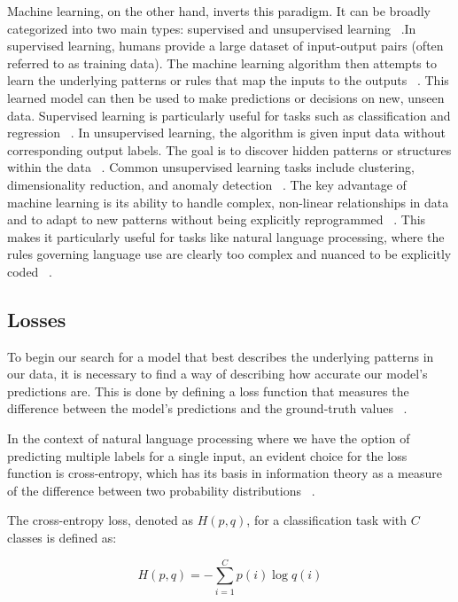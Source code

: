 \documentclass[a4paper, oneside]{discothesis}
\begin{document}
Machine learning, on the other hand, inverts this paradigm. It can be broadly categorized into two main types: supervised and unsupervised learning ~\cite{murphy2012machine}.In supervised learning, humans provide a large dataset of input-output pairs (often referred to as training data). 
The machine learning algorithm then attempts to learn the underlying patterns or rules that map the inputs to the outputs ~\cite{hastie2009elements}. 
This learned model can then be used to make predictions or decisions on new, unseen data.
Supervised learning is particularly useful for tasks such as classification and regression ~\cite{bishop2006pattern}.
In unsupervised learning, the algorithm is given input data without corresponding output labels. The goal is to discover hidden patterns or structures within the data ~\cite{ghahramani2004unsupervised}. Common unsupervised learning tasks include clustering, dimensionality reduction, and anomaly detection ~\cite{hinton2006reducing}.
The key advantage of machine learning is its ability to handle complex, non-linear relationships in data and to adapt to new patterns without being explicitly reprogrammed ~\cite{goodfellow2016deep}. 
This makes it particularly useful for tasks like natural language processing, where the rules governing language use are clearly too complex and nuanced to be explicitly coded ~\cite{jurafsky2009speech}.

\subsection{Losses}
To begin our search for a model that best describes the underlying patterns in our data, it is necessary to find a way of describing how accurate our model's predictions are.
This is done by defining a loss function that measures the difference between the model's predictions and the ground-truth values ~\cite{goodfellow2016deep}.

In the context of natural language processing where we have the option of predicting multiple labels for a single input, an evident choice for the loss function is cross-entropy, which 
has its basis in information theory as a measure of the difference between two probability distributions ~\cite{shannon1948mathematical}.

The cross-entropy loss, denoted as $H(p,q)$, for a classification task with $C$ classes is defined as:

\begin{equation}
    H(p,q) = -\sum_{i=1}^C p(i) \log q(i)
\end{equation}
\end{document}
